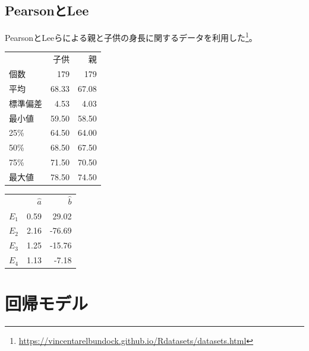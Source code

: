 \section{PearsonとLee}
PearsonとLeeらによる親と子供の身長に関するデータを利用した\footnote{\url{https://vincentarelbundock.github.io/Rdatasets/datasets.html}}。
\begin{table}[http]
 \centering
 \begin{tabular}{lrr}
  {} &  子供 &  親 \\
  個数 & 179 &  179 \\
  平均  &  68.33 &   67.08 \\
  標準偏差   &   4.53 &    4.03 \\
  最小値   &  59.50 &   58.50 \\
  25\%   &  64.50 &   64.00 \\
  50\%   &  68.50 &   67.50 \\
  75\%   &  71.50 &   70.50 \\
  最大値   &  78.50 &   74.50 \\
 \end{tabular}
\end{table}


\begin{table}[http]
 \centering
\begin{tabular}{lrr}
{} &    $\hat{a}$ &      $\hat{b}$ \\
$E_1$ & 0.59 &  29.02 \\
 $E_2$ & 2.16 & -76.69 \\
$E_3$ & 1.25 & -15.76 \\
$E_4$ & 1.13 &  -7.18 \\
\end{tabular}
\end{table}
\fi


\chapter{回帰モデル}


